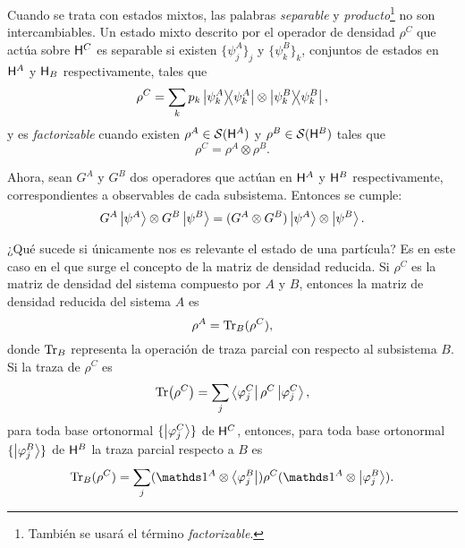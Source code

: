 Cuando se trata con estados mixtos, las palabras \textit{separable} y \textit{producto}\footnote{También se usará el término \textit{factorizable}.} no son intercambiables. Un estado mixto descrito por el operador de densidad $\rho^{C}$ que actúa sobre ${\sf H}^{C}$ es separable si existen $\{\psi_{j}^{A}\}_{j}$ y $\{\psi_{k}^{B}\}_{k}$, conjuntos de estados en ${\sf H}^{A}$ y ${\sf H}_{B}$ respectivamente, tales que
\begin{equation}
    \rho^{C}=\sum_{k}p_{k}\dyad{\psi_{k}^{A}}\otimes\dyad{\psi_{k}^{B}},\nonumber
\end{equation}
y es \textit{factorizable} cuando existen $\rho^{A}\in\mathcal{S}({\sf H}^{A})$ y $\rho^{B}\in\mathcal{S}({\sf H}^{B})$ tales que
\begin{equation}
    \rho^{C}=\rho^{A}\otimes\rho^{B}.\nonumber
\end{equation}

Ahora, sean $G^{A}$ y $G^{B}$ dos operadores que actúan en ${\sf H}^{A}$ y ${\sf H}^{B}$ respectivamente, correspondientes a observables de cada subsistema. Entonces se cumple:
\begin{equation}
    G^{A}\ket{\psi^{A}}\otimes G^{B}\ket{\psi^{B}}=(G^{A}\otimes G^{B})\ket{\psi^{A}}\otimes\ket{\psi^{B}}.\nonumber
\end{equation}

¿Qué sucede si únicamente nos es relevante el estado de una partícula? Es en este caso en el que surge el concepto de la matriz de densidad reducida. Si $\rho^{C}$ es la matriz de densidad del sistema compuesto por $A$ y $B$, entonces la matriz de densidad reducida del sistema $A$ es
\begin{equation}
    \rho^{A}=\Tr_{B}(\rho^{C}),\nonumber
\end{equation}
donde $\Tr_{B}$ representa la operación de traza parcial con respecto al subsistema $B$. Si la traza de $\rho^{C}$ es 
\begin{equation}
    \Tr(\rho^{C})=\sum_{j}\bra{\varphi^{C}_{j}}\rho^{C}\ket{\varphi^{C}_{j}},\nonumber
\end{equation}
para toda base ortonormal $\{\ket{\varphi^{C}_{j}}\}$ de ${\sf H}^{C}$, entonces, para toda base ortonormal $\{\ket{\varphi^{B}_{j}}\}$ de ${\sf H}^{B}$  la traza parcial respecto a $B$ es \cite{Hardy}
\begin{equation}\label{eq:Ch1PartialTrace}
    \Tr_{B}(\rho^{C})=\sum_{j}(\Id^{A}\otimes \bra{\varphi^{B}_{j}})\rho^{C}(\Id^{A}\otimes \ket{\varphi^{B}_{j}}).
\end{equation}

